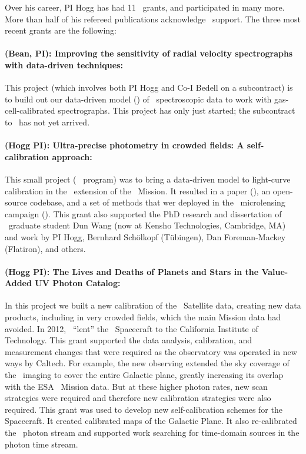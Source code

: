 \documentclass[12pt, letterpaper]{article}
\begin{document}

Over his career, PI Hogg has had 11 \NASA\ grants, and participated in
many more.
More than half of his refereed publications acknowledge \NASA\ support.
The three most recent grants are the following:

\paragraph{ (Bean, PI):
Improving the sensitivity of radial velocity spectrographs with data-driven techniques:}
This project (which involves both PI Hogg and Co-I Bedell on a subcontract)
is to
build out our data-driven model (\wobble) of \EPRV\ spectroscopic data
to work with gas-cell-calibrated spectrographs. This project has only
just started; the subcontract to \NYU\ has not yet arrived.

\paragraph{ (Hogg PI):
Ultra-precise photometry in crowded fields: A self-calibration approach:}
This small project (\Ktwo\  program)
was to bring a data-driven model to light-curve calibration
in the \Ktwo\ extension of the \Kepler\ Mission.
It resulted in a paper (\citealt{CPMdiff}), an open-source codebase,
and a set of methods that wer deployed in the \Ktwo\ microlensing campaign (\citealt{K2C9}).
This grant also supported the PhD research and dissertation of \NYU\ graduate
student Dun Wang (now at Kensho Technologies, Cambridge, MA) and work
by PI Hogg, Bernhard Sch\"olkopf (T\"ubingen), Dan Foreman-Mackey
(Flatiron), and others.

\paragraph{ (Hogg PI):
The Lives and Deaths of Planets and Stars in the Value-Added UV Photon Catalog:}
In this project we built a new calibration of the \GALEX\ Satellite
data, creating new data products, including in very crowded fields,
which the main Mission data had avoided.
In 2012, \NASA\ ``lent'' the \GALEX\ Spacecraft to the California Institute of Technology.
This grant supported the data analysis, calibration, and measurement
changes that were required as the observatory was operated in new
ways by Caltech.
For example, the new observing extended the sky coverage of the \GALEX\ imaging to
cover the entire Galactic plane, greatly increasing its overlap with
the ESA \Gaia\ Mission data.
But at these higher photon rates, new scan strategies were required and therefore
new calibration strategies were also required.
This grant was used to develop new self-calibration schemes for the Spacecraft.
It created calibrated maps of the Galactic Plane.
It also re-calibrated the \GALEX\ photon stream and supported work
searching for time-domain sources in the photon time stream.
\end{document}
